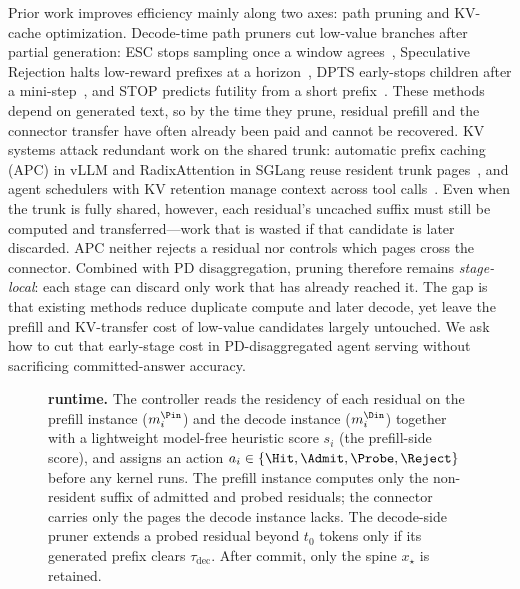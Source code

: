 Prior work improves efficiency mainly along two axes: path pruning and KV-cache optimization.
Decode-time path pruners cut low-value branches after partial generation: ESC stops sampling once a window agrees~\cite{esc}, Speculative Rejection halts low-reward prefixes at a horizon~\cite{specrej}, DPTS early-stops children after a mini-step~\cite{dpts}, and STOP predicts futility from a short prefix~\cite{stoploss}.
These methods depend on generated text, so by the time they prune, residual prefill and the connector transfer have often already been paid and cannot be recovered.
KV systems attack redundant work on the shared trunk: automatic prefix caching (APC) in vLLM and RadixAttention in SGLang reuse resident trunk pages~\cite{vllm,sglang}, and agent schedulers with KV retention manage context across tool calls~\cite{autellix,continuum,mori,conserve,forkkv}.
Even when the trunk is fully shared, however, each residual's uncached suffix must still be computed and transferred---work that is wasted if that candidate is later discarded.
APC neither rejects a residual nor controls which pages cross the connector.
Combined with PD disaggregation, pruning therefore remains \emph{stage-local}: each stage can discard only work that has already reached it.
The gap is that existing methods reduce duplicate compute and later decode, yet leave the prefill and KV-transfer cost of low-value candidates largely untouched.
We ask how to cut that early-stage cost in PD-disaggregated agent serving without sacrificing committed-answer accuracy.

\begin{figure}[t]
\centering
\resizebox{0.78\textwidth}{!}{}
\caption{\textbf{\sys{} runtime.}
The controller reads the residency of each residual on the prefill instance ($m_i^{\Pin}$) and the decode instance ($m_i^{\Din}$) together with a lightweight model-free heuristic score $s_i$ (the prefill-side score), and assigns an action $a_i\in\{\Hit,\Admit,\Probe,\Reject\}$ before any kernel runs.
The prefill instance computes only the non-resident suffix of admitted and probed residuals; the connector carries only the pages the decode instance lacks.
The decode-side pruner extends a probed residual beyond $t_0$ tokens only if its generated prefix clears $\tau_{\mathrm{dec}}$.
After commit, only the spine $x_\star$ is retained.}
\label{fig:system}
\end{figure}

